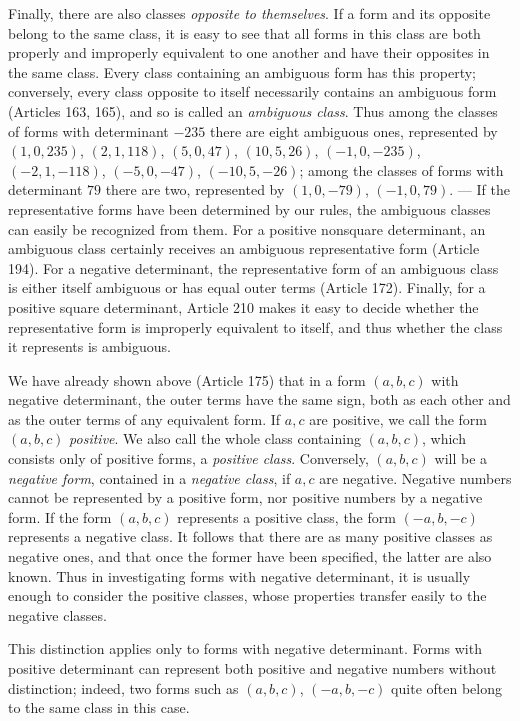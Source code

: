 Finally, there are also classes \textit{opposite to themselves}. If a form and its opposite belong to the same class, it is easy to see that all forms in this class are both properly and improperly equivalent to one another and have their opposites in the same class. Every class containing an ambiguous form has this property; conversely, every class opposite to itself necessarily contains an ambiguous form (Articles 163, 165), and so is called an \textit{ambiguous class}. Thus among the classes of forms with determinant $-235$ there are eight ambiguous ones, represented by $(1,0,235)$, $(2,1,118)$, $(5,0,47)$, $(10,5,26)$, $(-1,0,-235)$, $(-2,1,-118)$, $(-5,0,-47)$, $(-10,5,-26)$; among the classes of forms with determinant $79$ there are two, represented by $(1,0,-79)$, $(-1,0,79)$. --- If the representative forms have been determined by our rules, the ambiguous classes can easily be recognized from them. For a positive nonsquare determinant, an ambiguous class certainly receives an ambiguous representative form (Article 194). For a negative determinant, the representative form of an ambiguous class is either itself ambiguous or has equal outer terms (Article 172). Finally, for a positive square determinant, Article 210 makes it easy to decide whether the representative form is improperly equivalent to itself, and thus whether the class it represents is ambiguous.

We have already shown above (Article 175) that in a form $(a,b,c)$ with negative determinant, the outer terms have the same sign, both as each other and as the outer terms of any equivalent form. If $a,c$ are positive, we call the form $(a,b,c)$ \textit{positive}. We also call the whole class containing $(a,b,c)$, which consists only of positive forms, a \textit{positive class}. Conversely, $(a,b,c)$ will be a \textit{negative form}, contained in a \textit{negative class}, if $a,c$ are negative. Negative numbers cannot be represented by a positive form, nor positive numbers by a negative form. If the form $(a,b,c)$ represents a positive class, the form $(-a,b,-c)$ represents a negative class. It follows that there are as many positive classes as negative ones, and that once the former have been specified, the latter are also known. Thus in investigating forms with negative determinant, it is usually enough to consider the positive classes, whose properties transfer easily to the negative classes.

This distinction applies only to forms with negative determinant. Forms with positive determinant can represent both positive and negative numbers without distinction; indeed, two forms such as $(a,b,c)$, $(-a,b,-c)$ quite often belong to the same class in this case.
